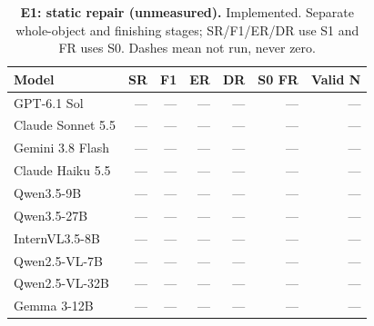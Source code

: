 \begin{table}[!ht]
\centering\small
\caption{\textbf{E1: static repair (unmeasured).} Implemented. Separate whole-object and finishing stages; SR/F1/ER/DR use S1 and FR uses S0. Dashes mean not run, never zero.}
\begin{tabularx}{\textwidth}{@{}Xrrrrrr@{}}\toprule
Model & SR & F1 & ER & DR & S0 FR & Valid N\\\midrule
GPT-6.1 Sol & --- & --- & --- & --- & --- & ---\\
Claude Sonnet 5.5 & --- & --- & --- & --- & --- & ---\\
Gemini 3.8 Flash & --- & --- & --- & --- & --- & ---\\
Claude Haiku 5.5 & --- & --- & --- & --- & --- & ---\\
Qwen3.5-9B & --- & --- & --- & --- & --- & ---\\
Qwen3.5-27B & --- & --- & --- & --- & --- & ---\\
InternVL3.5-8B & --- & --- & --- & --- & --- & ---\\
Qwen2.5-VL-7B & --- & --- & --- & --- & --- & ---\\
Qwen2.5-VL-32B & --- & --- & --- & --- & --- & ---\\
Gemma 3-12B & --- & --- & --- & --- & --- & ---\\
\bottomrule
\end{tabularx}
\end{table}
